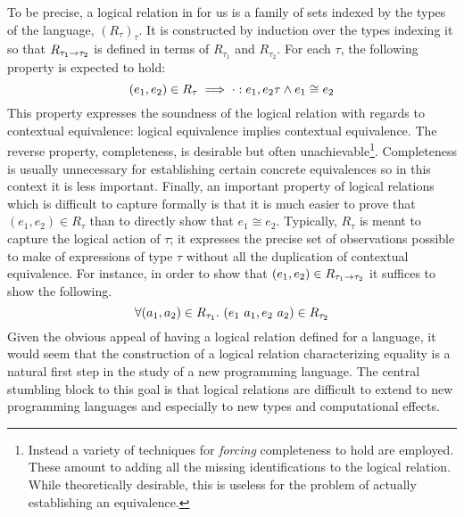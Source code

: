 To be precise, a logical relation in for us is a family of sets
indexed by the types of the language, $(R_\tau)_\tau$. It is
constructed by induction over the types indexing it so that
$R_{\tau_1 \to \tau_2}$ is defined in terms of $R_{\tau_1}$ and
$R_{\tau_2}$. For each $\tau$, the following property is expected to
hold:
\[
  (e_1, e_2) \in R_\tau \implies
  \cdot \mathrel{:} e_1, e_2{\tau} \land e_1 \cong e_2
\]
This property expresses the soundness of the logical relation with
regards to contextual equivalence: logical equivalence implies
contextual equivalence. The reverse property, completeness, is
desirable but often unachievable\footnote{Instead a variety of
  techniques for \emph{forcing} completeness to hold are
  employed. These amount to adding all the missing identifications to
  the logical relation. While theoretically desirable, this is useless
  for the problem of actually establishing an
  equivalence.}. Completeness is usually unnecessary for establishing
certain concrete equivalences so in this context it is less
important. Finally, an important property of logical relations which
is difficult to capture formally is that it is much easier to prove
that $(e_1, e_2) \in R_\tau$ than to directly show that
$e_1 \cong e_2$. Typically, $R_\tau$ is meant to capture the logical
action of $\tau$; it expresses the precise set of observations
possible to make of expressions of type $\tau$ without all the
duplication of contextual equivalence. For instance, in order to show
that $(e_1, e_2) \in R_{\tau_1 \to \tau_2}$ it suffices to show the
following.
\[
  \forall (a_1, a_2) \in R_{\tau_1}.
  \ (e_1\ a_1, e_2\ a_2) \in R_{\tau_2}
\]
Given the obvious appeal of having a logical relation defined for a
language, it would seem that the construction of a logical relation
characterizing equality is a natural first step in the study of a new
programming language. The central stumbling block to this goal is that
logical relations are difficult to extend to new programming languages
and especially to new types and computational effects.

